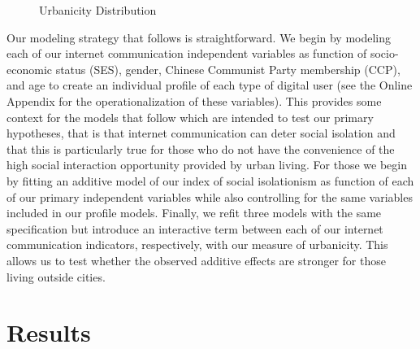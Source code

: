 \documentclass[
  letterpaper,
  DIV=11,
  numbers=noendperiod]{scrartcl}
\begin{document}
\begin{figure}


\caption{\label{fig-urban-dist}Urbanicity Distribution}

\end{figure}%

Our modeling strategy that follows is straightforward. We begin by
modeling each of our internet communication independent variables as
function of socio-economic status (SES), gender, Chinese Communist Party
membership (CCP), and age to create an individual profile of each type
of digital user (see the Online Appendix for the operationalization of
these variables). This provides some context for the models that follow
which are intended to test our primary hypotheses, that is that internet
communication can deter social isolation and that this is particularly
true for those who do not have the convenience of the high social
interaction opportunity provided by urban living. For those we begin by
fitting an additive model of our index of social isolationism as
function of each of our primary independent variables while also
controlling for the same variables included in our profile models.
Finally, we refit three models with the same specification but introduce
an interactive term between each of our internet communication
indicators, respectively, with our measure of urbanicity. This allows us
to test whether the observed additive effects are stronger for those
living outside cities.

\section{Results}\label{results}
\end{document}

